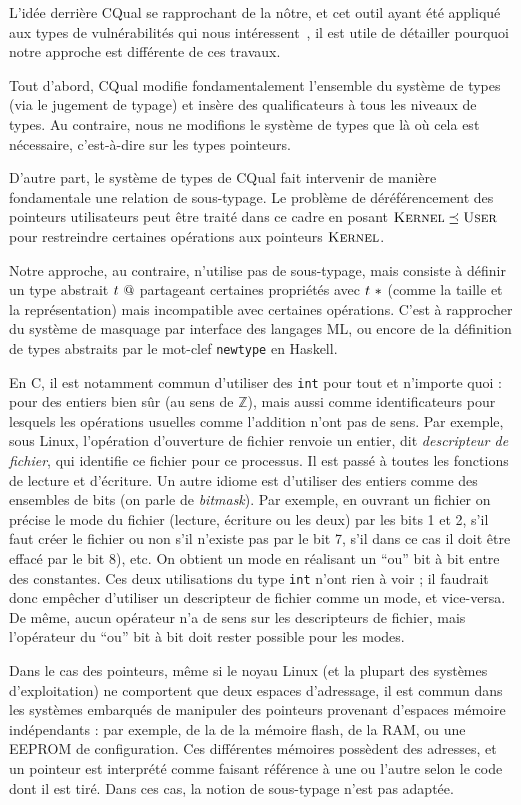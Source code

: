 L'idée derrière CQual se rapprochant de la nôtre, et cet outil ayant été
appliqué aux types de vulnérabilités qui nous intéressent~\cite{cquk-usenix04},
il est utile de détailler pourquoi notre approche est différente de ces travaux.

Tout d'abord, CQual modifie fondamentalement l'ensemble du système de types (via
le jugement de typage) et insère des qualificateurs à tous les niveaux de types.
Au contraire, nous ne modifions le système de types que là où cela est
nécessaire, c'est-à-dire sur les types pointeurs.

D'autre part, le système de types de CQual fait intervenir de manière
fondamentale une relation de sous-typage. Le problème de déréférencement des
pointeurs utilisateurs peut être traité dans ce cadre en posant $\textsc{Kernel}
\preceq \textsc{User}$ pour restreindre certaines opérations aux pointeurs $\textsc{Kernel}$.

Notre approche, au contraire, n'utilise pas de sous-typage, mais consiste à
définir un type abstrait $t~@$ partageant certaines propriétés avec
$t~*$ (comme la taille et la représentation) mais incompatible avec
certaines opérations. C'est à rapprocher du système de masquage par interface
des langages ML, ou encore de la définition de types abstraits par le mot-clef
\texttt{newtype} en Haskell.

En C, il est notamment commun d'utiliser des \texttt{int} pour tout et n'importe
quoi : pour des entiers bien sûr (au sens de $ℤ$), mais aussi comme
identificateurs pour lesquels les opérations usuelles comme l'addition n'ont pas
de sens. Par exemple, sous Linux, l'opération d'ouverture de fichier renvoie un
entier, dit \emph{descripteur de fichier}, qui identifie ce fichier pour ce
processus. Il est passé à toutes les fonctions de lecture et d'écriture. Un
autre idiome est d'utiliser des entiers comme des ensembles de bits (on parle de
\emph{bitmask}). Par exemple, en ouvrant un fichier on précise le mode du
fichier (lecture, écriture ou les deux) par les bits 1 et 2, s'il faut créer le
fichier ou non s'il n'existe pas par le bit 7, s'il dans ce cas il doit être
effacé par le bit 8), etc. On obtient un mode en réalisant un ``ou'' bit à bit
entre des constantes. Ces deux utilisations du type \texttt{int} n'ont rien à
voir ; il faudrait donc empêcher d'utiliser un descripteur de fichier comme un
mode, et vice-versa. De même, aucun opérateur n'a de sens sur les descripteurs
de fichier, mais l'opérateur \texttt{\textbar{}} du ``ou'' bit à bit doit rester
possible pour les modes.

Dans le cas des pointeurs, même si le noyau Linux (et la plupart des systèmes
d'exploitation) ne comportent que deux espaces d'adressage, il est commun dans
les systèmes embarqués de manipuler des pointeurs provenant d'espaces mémoire
indépendants : par exemple, de la de la mémoire flash, de la RAM, ou une EEPROM
de configuration. Ces différentes mémoires possèdent des adresses, et un
pointeur est interprété comme faisant référence à une ou l'autre selon le code
dont il est tiré. Dans ces cas, la notion de sous-typage n'est pas adaptée.
